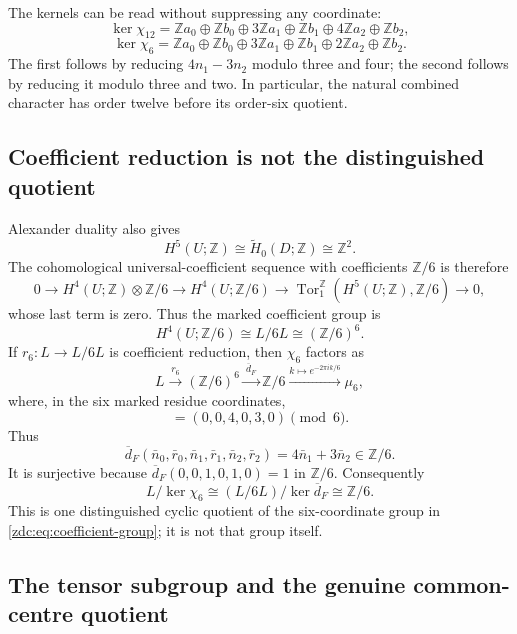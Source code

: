 The kernels can be read without suppressing any coordinate:
\[
 \ker\chi_{12}=
 \mathbb Za_0\oplus\mathbb Zb_0\oplus
 3\mathbb Za_1\oplus\mathbb Zb_1\oplus
 4\mathbb Za_2\oplus\mathbb Zb_2,
\]
\[
 \ker\chi_6=
 \mathbb Za_0\oplus\mathbb Zb_0\oplus
 3\mathbb Za_1\oplus\mathbb Zb_1\oplus
 2\mathbb Za_2\oplus\mathbb Zb_2.
\]
The first follows by reducing $4n_1-3n_2$ modulo three and four; the
second follows by reducing it modulo three and two.  In particular, the
natural combined character has order twelve before its order-six quotient.

\subsection{Coefficient reduction is not the distinguished quotient}
\label{zdc:subsec:coefficients}

Alexander duality also gives
\[
 H^5(U;\mathbb Z)\cong\widetilde H_0(D;\mathbb Z)\cong\mathbb Z^2.
\]
The cohomological universal-coefficient sequence with coefficients
\(\mathbb Z/6\) is therefore
\[
 0\longrightarrow H^4(U;\mathbb Z)\otimes\mathbb Z/6
 \longrightarrow H^4(U;\mathbb Z/6)
 \longrightarrow
 \operatorname{Tor}_1^{\mathbb Z}(H^5(U;\mathbb Z),\mathbb Z/6)
 \longrightarrow0,
\]
whose last term is zero.  Thus the marked coefficient group is
\begin{equation}
 \boxed{H^4(U;\mathbb Z/6)\cong L/6L\cong(\mathbb Z/6)^6.}
 \label{zdc:eq:coefficient-group}
\end{equation}
If $r_6:L\to L/6L$ is coefficient reduction, then $\chi_6$ factors as
\[
 L\xrightarrow{r_6}(\mathbb Z/6)^6
 \xrightarrow{\ \overline d_F\ }\mathbb Z/6
 \xrightarrow{k\mapsto e^{-2\pi ik/6}}\mu_6,
\]
where, in the six marked residue coordinates,
\begin{equation}
 [\overline d_F]=(0,0,4,0,3,0)\pmod6.
 \label{zdc:eq:distinguished-mod-six-row}
\end{equation}
Thus
\[
 \overline d_F(\bar n_0,\bar r_0,\bar n_1,
                    \bar r_1,\bar n_2,\bar r_2)
 =4\bar n_1+3\bar n_2\in\mathbb Z/6.
\]
It is surjective because $\overline d_F(0,0,1,0,1,0)=1$ in
$\mathbb Z/6$.
Consequently
\[
 L/\ker\chi_6
 \cong (L/6L)/\ker\overline d_F
 \cong\mathbb Z/6.
\]
This is one distinguished cyclic quotient of the six-coordinate group in
\eqref{zdc:eq:coefficient-group}; it is not that group itself.

\subsection{The tensor subgroup and the genuine common-centre quotient}
\label{zdc:subsec:groups}

